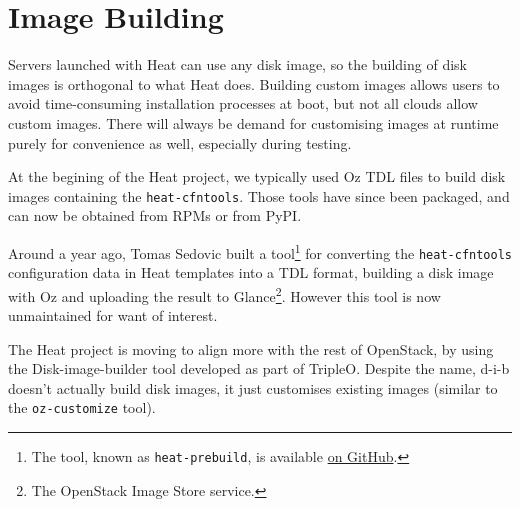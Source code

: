 \section{Image Building}

Servers launched with Heat can use any disk image, so the building of disk images is orthogonal to what Heat does. Building custom images allows users to avoid time-consuming installation processes at boot, but not all clouds allow custom images. There will always be demand for customising images at runtime purely for convenience as well, especially during testing.

At the begining of the Heat project, we typically used Oz TDL files to build disk images containing the \texttt{heat-cfntools}. Those tools have since been packaged, and can now be obtained from RPMs or from PyPI.

Around a year ago, Tomas Sedovic built a tool\footnote{The tool, known as \texttt{heat-prebuild}, is available \href{https://github.com/sdake/heat-prebuild}{on GitHub}.} for converting the \texttt{heat-cfntools} configuration data in Heat templates into a TDL format, building a disk image with Oz and uploading the result to Glance\footnote{The OpenStack Image Store service.}. However this tool is now unmaintained for want of interest.

The Heat project is moving to align more with the rest of OpenStack, by using the Disk-image-builder tool developed as part of TripleO. Despite the name, d-i-b doesn't actually build disk images, it just customises existing images (similar to the \texttt{oz-customize} tool).
